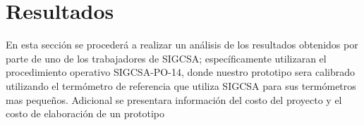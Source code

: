 \chapter{Resultados}

\par 
En esta sección se procederá a realizar un análisis de los resultados obtenidos por parte de uno de los trabajadores de SIGCSA; específicamente utilizaran el procedimiento operativo SIGCSA-PO-14, donde nuestro prototipo sera calibrado utilizando el termómetro de referencia que utiliza SIGCSA para sus termómetros mas pequeños. Adicional se presentara información del costo del proyecto y el costo de elaboración de un prototipo

